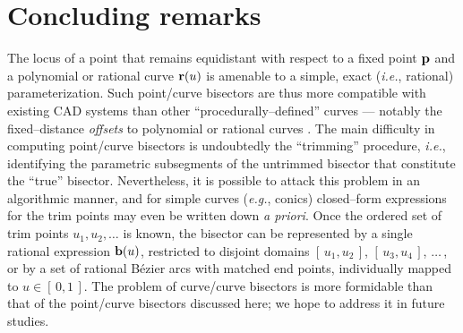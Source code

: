 
\section{Concluding remarks}
\label{conclusion}

The locus of a point that remains equidistant with respect
to a fixed point ${\bf p}$ and a polynomial or rational curve
${\bf r}(u)$ is amenable to a simple, exact ({\it i.e.}, rational)
parameterization. Such point/curve bisectors are thus
more compatible with existing CAD systems than other
``procedurally--defined'' curves --- notably the fixed--distance
{\it offsets\/} to polynomial or rational curves \cite{farouki90}.
The main difficulty in computing point/curve bisectors is
undoubtedly the  ``trimming'' procedure, {\it i.e.}, identifying
the parametric subsegments of the untrimmed
bisector that constitute the ``true'' bisector. Nevertheless,
it is possible to attack this problem in
an algorithmic manner, and for simple curves ({\it e.g.}, conics)
closed--form expressions for the trim points may even be
written down {\it a priori}.
Once the ordered set of trim points $u_1,u_2,\ldots$ is known, the
bisector can be represented by a single rational expression ${\bf b}(u)$,
restricted to disjoint domains $[\,u_1,u_2\,]$,
$[\,u_3,u_4\,]$, $\ldots\,$, or by a set of rational B\'ezier arcs
with matched end points, individually mapped to $u \in [\,0,1\,]$.
The problem of curve/curve bisectors is more formidable than that
of the point/curve bisectors discussed here; we hope to address it
in future studies.

